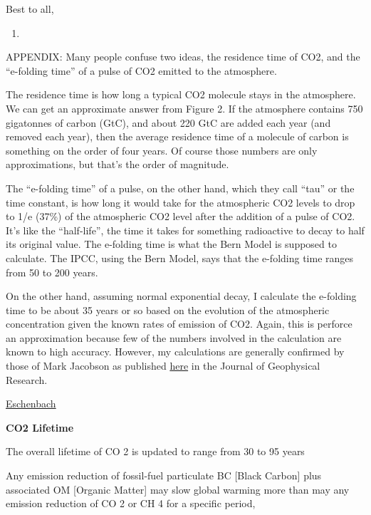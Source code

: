 \documentclass[
]{book}
\providecommand{\tightlist}{%
  \setlength{\itemsep}{0pt}\setlength{\parskip}{0pt}}
\begin{document}
Best to all,

\begin{enumerate}
\def\labelenumi{\alph{enumi}.}
\setcounter{enumi}{22}
\tightlist
\item
\end{enumerate}

APPENDIX: Many people confuse two ideas, the residence time of CO2, and the ``e-folding time'' of a pulse of CO2 emitted to the atmosphere.

The residence time is how long a typical CO2 molecule stays in the atmosphere. We can get an approximate answer from Figure 2. If the atmosphere contains 750 gigatonnes of carbon (GtC), and about 220 GtC are added each year (and removed each year), then the average residence time of a molecule of carbon is something on the order of four years. Of course those numbers are only approximations, but that's the order of magnitude.

The ``e-folding time'' of a pulse, on the other hand, which they call ``tau'' or the time constant, is how long it would take for the atmospheric CO2 levels to drop to 1/e (37\%) of the atmospheric CO2 level after the addition of a pulse of CO2. It's like the ``half-life'', the time it takes for something radioactive to decay to half its original value. The e-folding time is what the Bern Model is supposed to calculate. The IPCC, using the Bern Model, says that the e-folding time ranges from 50 to 200 years.

On the other hand, assuming normal exponential decay, I calculate the e-folding time to be about 35 years or so based on the evolution of the atmospheric concentration given the known rates of emission of CO2. Again, this is perforce an approximation because few of the numbers involved in the calculation are known to high accuracy. However, my calculations are generally confirmed by those of Mark Jacobson as published \href{http://www.stanford.edu/group/efmh/jacobson/Articles/VIII/fossil/ClimRespUpdJGR\%201.pdf}{here} in the Journal of Geophysical Research.

\href{https://climateilluminated.com/CO2_facts/carbon_cycle/CO2_residence_Bern_model.html}{Eschenbach}

\textbf{CO2 Lifetime}

The overall lifetime of CO 2 is updated to range from 30 to 95 years

Any emission reduction of fossil-fuel particulate BC {[}Black Carbon{]} plus
associated OM {[}Organic Matter{]} may slow global warming more
than may any emission reduction of CO 2 or CH 4 for a specific period,
\end{document}
